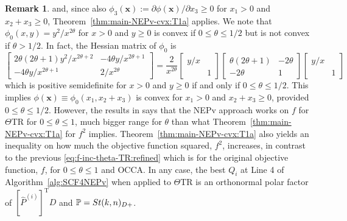 \documentclass[11pt]{article}
\def\bx{\pmb{x}}
\def\bbP{\mathbb{P}}
\def\what{\widehat}
\newcommand\STM[2]{{\rm St}(#1,#2)}
\DeclareMathOperator{\T}{T}
\theoremstyle{definition}
\newtheorem{remark}{Remark}[section]
\numberwithin{equation}{section}
\begin{document}
\begin{remark}
and, since also $\phi_3(\bx):=\partial\phi(\bx)/\partial x_3\ge 0$ for $x_1>0$ and $x_2+x_3\ge 0$, Theorem~\ref{thm:main-NEPv-cvx:T1a} applies.
We note that
$\phi_0(x,y)= {y^2}/{x^{2\theta}}$
for
$x>0$ and $y\ge 0$
is convex if $0\le\theta\le 1/2$ but is not convex if $\theta>1/2$. In fact, the Hessian matrix of $\phi_0$ is
$$
\begin{bmatrix}
2\theta(2\theta+1) {y^2}/{x^{2\theta+2}} & -4\theta y/{x^{2\theta+1}} \\
-4\theta y/{x^{2\theta+1}} &  2/{x^{2\theta}}
\end{bmatrix}
=\frac 2{x^{2\theta}}
 \begin{bmatrix}
    y/x &  \\
    & 1
 \end{bmatrix}
 \begin{bmatrix}
   \theta(2\theta+1) & -2\theta \\
   -2\theta & 1
 \end{bmatrix}
 \begin{bmatrix}
    y/x &  \\
    & 1
 \end{bmatrix}
$$
which is positive semidefinite for $x>0$ and $y\ge 0$ if and only if $0\le\theta\le 1/2$.
This implies
$\phi(\bx)\equiv\phi_0(x_1,x_2+x_3)$ is convex for $x_1>0$ and $x_2+x_3\ge 0$, provided  $0\le\theta\le 1/2$.
However, the results in
\cite{wazl:2023} says that the NEPv approach works on $f$ for $\Theta$TR for $0\le\theta\le 1$,
much bigger range for $\theta$
than what Theorem~\ref{thm:main-NEPv-cvx:T1a} for $f^2$ implies.
Theorem~\ref{thm:main-NEPv-cvx:T1a} also yields an inequality on how much the  objective function squared,
$f^2$, increases, in contrast to the previous \eqref{eq:f-inc-theta-TR:refined} which is for the original objective function, $f$, for $0\le\theta\le 1$ and OCCA.
In any case, the best $Q_i$ at Line 4 of Algorithm~\ref{alg:SCF4NEPv} when applied to $\Theta$TR
is an orthonormal polar factor of $[\what P^{(i)}]^{\T}D$ and $\bbP=\STM{k}{n}_{D+}$.
\end{remark}
\end{document}
